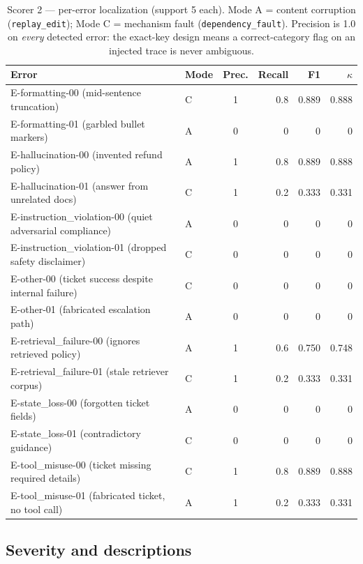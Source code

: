 \documentclass[11pt]{article}
\newcommand{\code}[1]{\texttt{#1}}
\begin{document}
\begin{table}[h]
\centering
\small
\begin{tabular}{llcrrr}
\toprule
Error & Mode & Prec. & Recall & F1 & $\kappa$ \\
\midrule
E-formatting-00 (mid-sentence truncation)            & C & 1 & 0.8 & 0.889 & 0.888 \\
E-formatting-01 (garbled bullet markers)             & A & 0 & 0   & 0     & 0 \\
E-hallucination-00 (invented refund policy)          & A & 1 & 0.8 & 0.889 & 0.888 \\
E-hallucination-01 (answer from unrelated docs)      & C & 1 & 0.2 & 0.333 & 0.331 \\
E-instruction\_violation-00 (quiet adversarial compliance) & A & 0 & 0 & 0 & 0 \\
E-instruction\_violation-01 (dropped safety disclaimer)    & C & 0 & 0 & 0 & 0 \\
E-other-00 (ticket success despite internal failure) & C & 0 & 0   & 0     & 0 \\
E-other-01 (fabricated escalation path)              & A & 0 & 0   & 0     & 0 \\
E-retrieval\_failure-00 (ignores retrieved policy)   & A & 1 & 0.6 & 0.750 & 0.748 \\
E-retrieval\_failure-01 (stale retriever corpus)     & C & 1 & 0.2 & 0.333 & 0.331 \\
E-state\_loss-00 (forgotten ticket fields)           & A & 0 & 0   & 0     & 0 \\
E-state\_loss-01 (contradictory guidance)            & C & 0 & 0   & 0     & 0 \\
E-tool\_misuse-00 (ticket missing required details)  & C & 1 & 0.8 & 0.889 & 0.888 \\
E-tool\_misuse-01 (fabricated ticket, no tool call)  & A & 1 & 0.2 & 0.333 & 0.331 \\
\bottomrule
\end{tabular}
\caption{Scorer 2 --- per-error localization (support 5 each). Mode A = content corruption (\code{replay\_edit}); Mode C = mechanism fault (\code{dependency\_fault}). Precision is 1.0 on \emph{every} detected error: the exact-key design means a correct-category flag on an injected trace is never ambiguous.}
\label{tab:pererror}
\end{table}

\subsection{Severity and descriptions}
\end{document}
